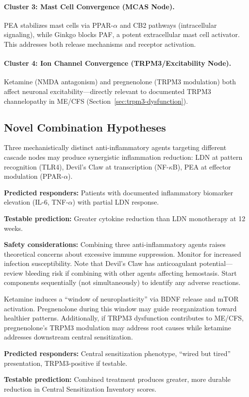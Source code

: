 \paragraph{Cluster 3: Mast Cell Convergence (MCAS Node).}
PEA stabilizes mast cells via PPAR-$\alpha$ and CB2 pathways (intracellular signaling), while Ginkgo blocks PAF, a potent extracellular mast cell activator. This addresses both release mechanisms and receptor activation.

\paragraph{Cluster 4: Ion Channel Convergence (TRPM3/Excitability Node).}
Ketamine (NMDA antagonism) and pregnenolone (TRPM3 modulation) both affect neuronal excitability---directly relevant to documented TRPM3 channelopathy in ME/CFS (Section~\ref{sec:trpm3-dysfunction}).

\subsection{Novel Combination Hypotheses}

\begin{hypothesis}
\label{hyp:triple-anti-inflammatory}
Three mechanistically distinct anti-inflammatory agents targeting different cascade nodes may produce synergistic inflammation reduction: LDN at pattern recognition (TLR4), Devil's Claw at transcription (NF-$\kappa$B), PEA at effector modulation (PPAR-$\alpha$).

\textbf{Predicted responders:} Patients with documented inflammatory biomarker elevation (IL-6, TNF-$\alpha$) with partial LDN response.

\textbf{Testable prediction:} Greater cytokine reduction than LDN monotherapy at 12 weeks.

\textbf{Safety considerations:} Combining three anti-inflammatory agents raises theoretical concerns about excessive immune suppression. Monitor for increased infection susceptibility. Note that Devil's Claw has anticoagulant potential---review bleeding risk if combining with other agents affecting hemostasis. Start components sequentially (not simultaneously) to identify any adverse reactions.
\end{hypothesis}

\begin{hypothesis}
\label{hyp:neuroplasticity-combo}
Ketamine induces a ``window of neuroplasticity'' via BDNF release and mTOR activation. Pregnenolone during this window may guide reorganization toward healthier patterns. Additionally, if TRPM3 dysfunction contributes to ME/CFS, pregnenolone's TRPM3 modulation may address root causes while ketamine addresses downstream central sensitization.

\textbf{Predicted responders:} Central sensitization phenotype, ``wired but tired'' presentation, TRPM3-positive if testable.

\textbf{Testable prediction:} Combined treatment produces greater, more durable reduction in Central Sensitization Inventory scores.
\end{hypothesis}

